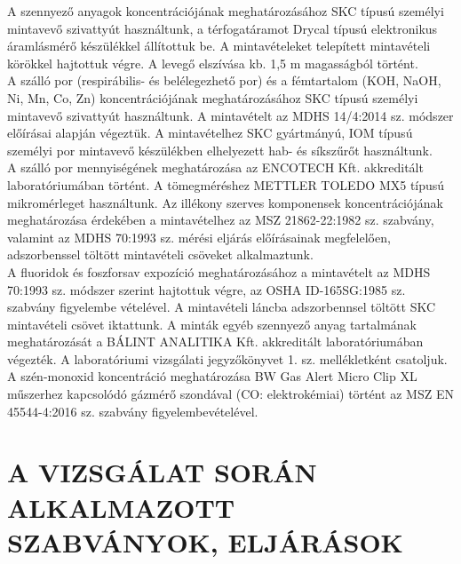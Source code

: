 \documentclass[a4paper,12pt]{article}
\begin{document}
	\begin{adjustwidth}{1cm}{0cm}

		\vspace{1.0em} %

		A szennyező anyagok koncentrációjának meghatározásához SKC típusú személyi
mintavevő szivattyút használtunk, a térfogatáramot Drycal típusú elektronikus
áramlásmérő készülékkel állítottuk be. A mintavételeket telepített mintavételi körökkel
hajtottuk végre. A levegő elszívása kb. 1,5 m magasságból történt. \\
A szálló por (respirábilis- és belélegezhető por) és a fémtartalom (KOH, NaOH, Ni, Mn, Co,
Zn) koncentrációjának meghatározásához SKC típusú személyi mintavevő szivattyút
használtunk. A mintavételt az MDHS 14/4:2014 sz. módszer előírásai alapján végeztük. A
mintavételhez SKC gyártmányú, IOM típusú személyi por mintavevő készülékben
elhelyezett hab- és síkszűrőt használtunk. \\
A szálló por mennyiségének meghatározása az ENCOTECH Kft. akkreditált
laboratóriumában történt. A tömegméréshez METTLER TOLEDO MX5 típusú
mikromérleget használtunk. Az illékony szerves komponensek koncentrációjának meghatározása érdekében a
mintavételhez az MSZ 21862-22:1982 sz. szabvány, valamint az MDHS 70:1993 sz. mérési
eljárás előírásainak megfelelően, adszorbenssel töltött mintavételi csöveket
alkalmaztunk. \\
A fluoridok és foszforsav expozíció meghatározásához a mintavételt az MDHS 70:1993 sz.
módszer szerint hajtottuk végre, az OSHA ID-165SG:1985 sz. szabvány figyelembe
vételével. A mintavételi láncba adszorbennsel töltött SKC mintavételi csövet iktattunk.
A minták egyéb szennyező anyag tartalmának meghatározását a BÁLINT ANALITIKA Kft.
akkreditált laboratóriumában végezték. A laboratóriumi vizsgálati jegyzőkönyvet
1. sz. mellékletként csatoljuk. \\
A szén-monoxid koncentráció meghatározása BW Gas Alert Micro Clip XL műszerhez
kapcsolódó gázmérő szondával (CO: elektrokémiai) történt az MSZ EN 45544-4:2016 sz.
szabvány figyelembevételével.

		\vspace{1.0em}

	\end{adjustwidth}
	
	
	\newpage
	\section{A VIZSGÁLAT SORÁN ALKALMAZOTT SZABVÁNYOK, ELJÁRÁSOK}
	
\end{document}
